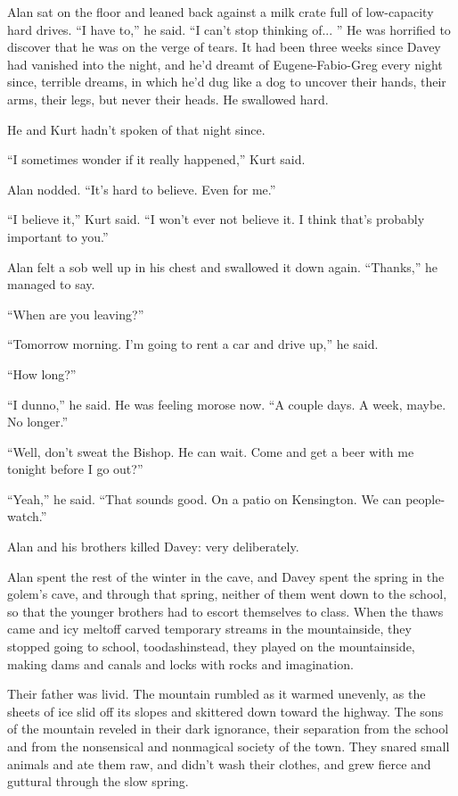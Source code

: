 Alan sat on the floor and leaned back against a milk crate full of
low-capacity hard drives.  ``I have to,'' he said.  ``I can't stop
thinking of...  '' He was horrified to discover that he was on the
verge of tears.  It had been three weeks since Davey had vanished into
the night, and he'd dreamt of Eugene-Fabio-Greg every night since,
terrible dreams, in which he'd dug like a dog to uncover their hands,
their arms, their legs, but never their heads.  He swallowed hard.

He and Kurt hadn't spoken of that night since.

``I sometimes wonder if it really happened,'' Kurt said.

Alan nodded.  ``It's hard to believe.  Even for me.''

``I believe it,'' Kurt said.  ``I won't ever not believe it.  I think
that's probably important to you.''

Alan felt a sob well up in his chest and swallowed it down again. 
``Thanks,'' he managed to say.

``When are you leaving?''

``Tomorrow morning.  I'm going to rent a car and drive up,'' he said.

``How long?''

``I dunno,'' he said.  He was feeling morose now.  ``A couple days.  A
week, maybe.  No longer.''

``Well, don't sweat the Bishop.  He can wait.  Come and get a beer
with me tonight before I go out?''

``Yeah,'' he said.  ``That sounds good.  On a patio on Kensington.  We
can people-watch.''

 Alan and his brothers killed Davey:  very deliberately.

Alan spent the rest of the winter in the cave, and Davey spent the
spring in the golem's cave, and through that spring, neither of them
went down to the school, so that the younger brothers had to escort
themselves to class.  When the thaws came and icy meltoff carved
temporary streams in the mountainside, they stopped going to school,
toodash{}instead, they played on the mountainside, making dams and canals
and locks with rocks and imagination.

Their father was livid.  The mountain rumbled as it warmed unevenly,
as the sheets of ice slid off its slopes and skittered down toward the
highway.  The sons of the mountain reveled in their dark ignorance,
their separation from the school and from the nonsensical and
nonmagical society of the town.  They snared small animals and ate
them raw, and didn't wash their clothes, and grew fierce and guttural
through the slow spring.


